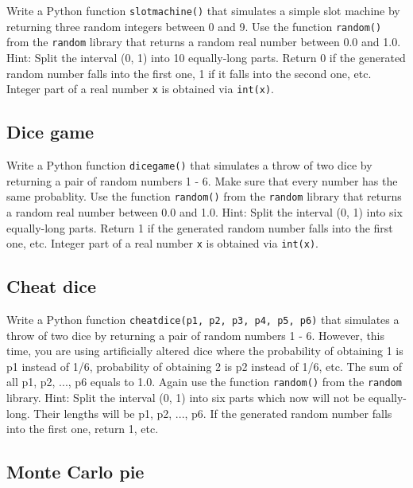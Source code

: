 Write a Python function {\tt slotmachine()} that simulates a simple slot machine
by returning three random integers between 0 and 9. Use the function 
{\tt random()} from the {\tt random} library that returns a random 
real number between 0.0 and 1.0. Hint: Split the interval (0, 1) into 10 
equally-long parts. Return 0 if the generated random number falls into the 
first one, 1 if it falls into the second one, etc. Integer part of a real number
{\tt x} is obtained via {\tt int(x)}.


\subsection{Dice game}

Write a Python function {\tt dicegame()} that simulates a throw of two
dice by returning a pair of random numbers 1 - 6. Make sure that 
every number has the same probablity. Use the function 
{\tt random()} from the {\tt random} library that returns a random 
real number between 0.0 and 1.0. Hint: Split the interval (0, 1) into six 
equally-long parts. Return 1 if the generated random number falls into the first one, 
etc. Integer part of a real number {\tt x} is obtained via {\tt int(x)}.


\subsection{Cheat dice}

Write a Python function {\tt cheatdice(p1, p2, p3, p4, p5, p6)} that simulates 
a throw of two dice by returning a pair of random numbers 1 - 6. However, this time,
you are using artificially altered dice where the probability of obtaining 1 is p1 
instead of 1/6, probability of obtaining 2 is p2 instead of 1/6, etc. The sum
of all p1, p2, ..., p6 equals to 1.0.
Again use the function {\tt random()} from the {\tt random} library. 
Hint: Split the interval
(0, 1) into six parts which now will not be equally-long. Their lengths will
be p1, p2, ..., p6. If the generated random number falls into the first one, return 1, 
etc.


\subsection{Monte Carlo pie}

